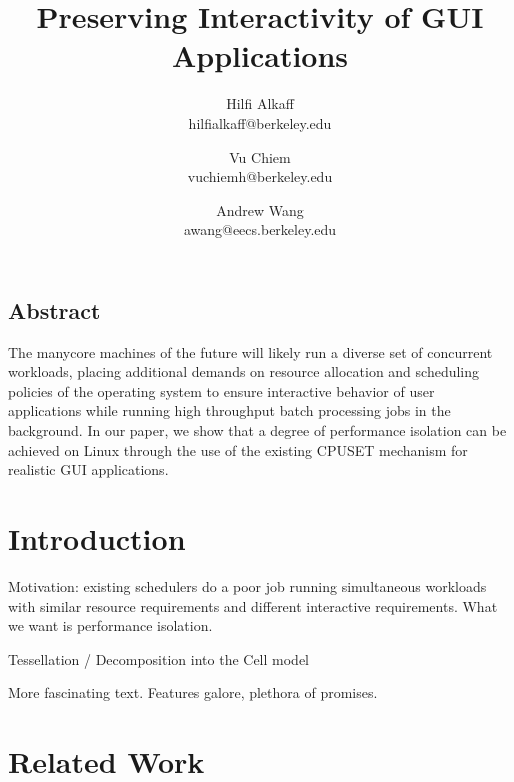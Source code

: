 \documentclass[letterpaper,twocolumn,10pt]{article}
\begin{document}
\date{}

\title{\Large \bf Preserving Interactivity of GUI Applications}

\author{
{\rm Hilfi Alkaff}\\
hilfialkaff@berkeley.edu
\and
{\rm Vu Chiem}\\
vuchiemh@berkeley.edu
\and
{\rm Andrew Wang}\\
awang@eecs.berkeley.edu
} %

\maketitle

\thispagestyle{empty}


\subsection*{Abstract}
The manycore machines of the future will likely run a diverse set of concurrent workloads, placing additional demands on resource allocation and scheduling policies of the operating system to ensure interactive behavior of user applications while running high throughput batch processing jobs in the background. In our paper, we show that a degree of performance isolation can be achieved on Linux through the use of the existing CPUSET mechanism for realistic GUI applications.

\section{Introduction}

Motivation: existing schedulers do a poor job running simultaneous workloads with similar resource requirements and different interactive requirements. What we want is performance isolation.

Tessellation / Decomposition into the Cell model


More fascinating text. Features galore, plethora of promises.\\

\section{Related Work}
\end{document}
